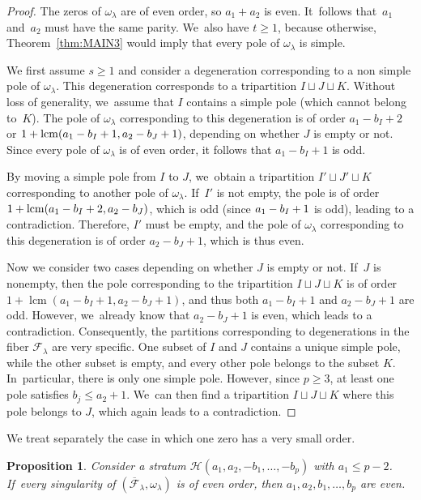 \documentclass[JEP,XML,SOM,Unicode,NoFloatCountersInSection,published]{cedram}
\DeclareMathOperator{\lcm}{lcm}
\newtheorem{prop}[thm]{Proposition}
\theoremstyle{definition}
\begin{document}
\begin{proof}
The zeros of $\omega_{\lambda}$ are of even order, so $a_{1}+a_{2}$ is even. It~follows that~$a_{1}$ and~$a_{2}$ must have the same parity. We~also have $t \geq 1$, because otherwise, Theorem~\ref{thm:MAIN3} would imply that every pole of $\omega_{\lambda}$ is simple.

We first assume $s \geq 1$ and consider a degeneration corresponding to a non simple pole of $\omega_{\lambda}$. This degeneration corresponds to a tripartition $I \sqcup J \sqcup K$. Without loss of generality, we~assume that $I$ contains a simple pole (which cannot belong to~$K$). The pole of $\omega_{\lambda}$ corresponding to this degeneration is of order $a_{1}-b_{I}+2$ or $1+\nobreak \lcm(a_{1}-\nobreak b_{I}+\nobreak 1,a_{2}-b_{J}+1)$, depending on whether $J$ is empty or not. Since every pole of $\omega_{\lambda}$ is of even order, it follows that $a_{1}-b_{I}+1$ is odd.

By moving a simple pole from $I$ to $J$, we~obtain a tripartition $I' \sqcup J' \sqcup K$ corresponding to another pole of $\omega_{\lambda}$. If~$I'$ is not empty, the pole is of order $1+\nobreak \lcm(a_{1}-\nobreak b_{I}+\nobreak 2,a_{2}-\nobreak b_{J})$, which is odd (since $a_{1}-\nobreak b_{I}+1$ is odd), leading to a contradiction. Therefore, $I'$ must be empty, and the pole of $\omega_{\lambda}$ corresponding to this degeneration is of order $a_{2}-b_{J}+1$, which is thus even.

Now we consider two cases depending on whether $J$ is empty or not. If~$J$ is nonempty, then the pole corresponding to the tripartition $I \sqcup J \sqcup K$ is of order $1+\lcm(a_{1}-b_{I}+1,a_{2}-b_{J}+1)$, and thus both $a_{1}-b_{I}+1$ and $a_{2}-b_{J}+1$ are odd. However, we~already know that $a_{2}-b_{J}+1$ is even, which leads to a contradiction. Consequently, the partitions corresponding to degenerations in the fiber $\mathcal{F}_{\lambda}$ are very specific. One subset of $I$ and $J$ contains a unique simple pole, while the other subset is empty, and every other pole belongs to the subset $K$. In~particular, there is only one simple pole. However, since $p \geq 3$, at least one pole satisfies $b_{j} \leq a_{2}+1$. We~can then find a tripartition $I \sqcup J \sqcup K$ where this pole belongs to $J$, which again leads to a contradiction.
\end{proof}

We treat separately the case in which one zero has a very small order.

\begin{prop}\label{prop:EvenEven1}
Consider a stratum $\mathcal{H}(a_{1},a_{2},-b_{1},\dots,-b_{p})$ with $a_{1} \leq p-2$. If~every singularity of $(\overline{\mathcal{F}}_{\lambda},\omega_{\lambda})$ is of even order, then $a_{1},a_{2},b_{1},\dots,b_{p}$ are even.
\end{prop}
\end{document}
